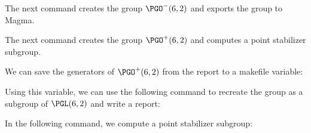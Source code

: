 

\bigskip

The next command creates the group 
$\PGO^-(6,2)$ and exports the group to Magma.



\bigskip



The next command creates the group 
$\PGO^+(6,2)$ and computes a point stabilizer subgroup.



\bigskip

We can save the generators of $\PGO^+(6,2)$ 
from the report to a makefile variable:


Using this variable, we can use the following command 
to recreate the group as a subgroup of 
$\PGL(6,2)$ and write a report:


In the following command, 
we compute a point stabilizer subgroup:



\bigskip



